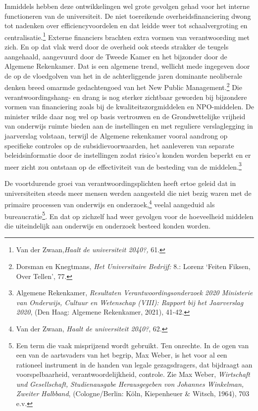 \documentclass[smallauthor, chapterhaspagenum, nochapterinheader, pagenuminheader,  bigchapnum,medium2, tocpages,  garamond, titleinheader]{jote-book}
\begin{document}
	Inmiddels hebben deze ontwikkelingen wel grote gevolgen gehad voor het interne functioneren van de universiteit. De niet toereikende overheidsfinanciering dwong tot nadenken over efficiencyvoordelen en dat leidde weer tot schaalvergroting en centralisatie.\footnote{Van der Zwaan,\emph{Haalt}\emph{ de universiteit 2040?,} 61. } Externe financiers brachten extra vormen van verantwoording met zich. En op dat vlak werd door de overheid ook steeds strakker de teugels aangehaald, aangevuurd door de Tweede Kamer en het bijzonder door de Algemene Rekenkamer. Dat is een algemene trend, wellicht mede ingegeven door de op de vloedgolven van het in de achterliggende jaren dominante neoliberale denken breed omarmde gedachtengoed van het New Public Management.\footnote{Dorsman en Knegtmans, \emph{Het Universitaire Bedrijf:} 8.: Lorenz ‘Feiten Fiksen, Over Tellen', 77.} Die verantwoordingshang- en drang is nog sterker zichtbaar geworden bij bijzondere vormen van financiering zoals bij de kwaliteitszorgmiddelen en NPO-middelen. De minister wilde daar nog wel op basis vertrouwen en de Grondwettelijke vrijheid van onderwijs ruimte bieden aan de instellingen en met reguliere verslaglegging in jaarverslag volstaan, terwijl de Algemene rekenkamer vooral aandrong op specifieke controles op de subsidievoorwaarden, het aanleveren van separate beleidsinformatie door de instellingen zodat risico's konden worden beperkt en er meer zicht zou ontstaan op de effectiviteit van de besteding van de middelen.\footnote{Algemene Rekenkamer, \emph{Resultaten Verantwoordingsonderzoek 2020 Ministerie van Onderwijs, Cultuur en Wetenschap (VIII): Rapport bij het Jaarverslag 2020}, (Den Haag: Algemene Rekenkamer, 2021), 41-42.}



	De voortdurende groei van verantwoordingsplichten heeft ertoe geleid dat in universiteiten steeds meer mensen werden aangesteld die niet bezig waren met de primaire processen van onderwijs en onderzoek,\footnote{Van der Zwaan, \emph{Haalt de universiteit 2040?}, 62.} veelal aangeduid als bureaucratie\footnote{Een term die vaak misprijzend wordt gebruikt. Ten onrechte. In de ogen van een van de aartsvaders van het begrip, Max Weber, is het voor al een rationeel instrument in de handen van legale gezagsdragers, dat bijdraagt aan voorspelbaarheid, verantwoordelijkheid, controle. Zie Max Weber, \emph{Wirtschaft}\emph{ }\emph{und}\emph{ }\emph{Gesellschaft}\emph{, }\emph{Studienausgabe}\emph{ }\emph{Herausgegeben}\emph{ }\emph{von}\emph{ Johannes Winkelman, }\emph{Zweiter}\emph{ }\emph{Halbband}, (Cologne/Berlin: Köln, Kiepenheuer \& Witsch, 1964), 703 e.v.}. En dat op zichzelf had weer gevolgen voor de hoeveelheid middelen die uiteindelijk aan onderwijs en onderzoek besteed konden worden.
\end{document}
